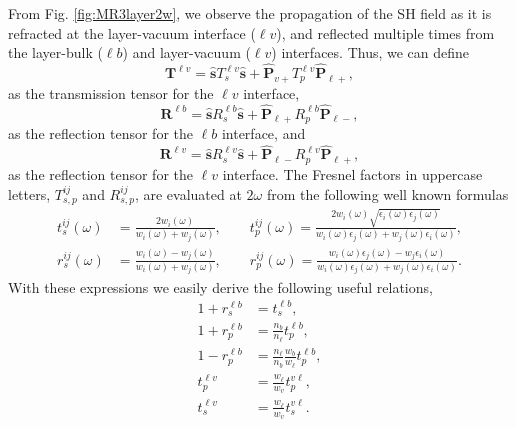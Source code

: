 From Fig. \ref{fig:MR3layer2w}, we observe the propagation of the SH field as it
is refracted at the layer-vacuum interface ($\ell v$), and  reflected multiple
times from the layer-bulk ($\ell b$) and layer-vacuum ($\ell v$) interfaces.
Thus, we can define
\begin{equation}\label{eq:r5}
\mathbf{T}^{\ell v}
= \hat{\mathbf{s}}T_{s}^{\ell v}\hat{\mathbf{s}} 
+ \hat{\mathbf{P}}_{v+}T_{p}^{\ell v} \hat{\mathbf{P}}_{\ell +},
\end{equation}
as the transmission tensor for the $\ell v$ interface,
\begin{equation}\label{eq:r6}
\mathbf{R}^{\ell b}
= \hat{\mathbf{s}}R_{s}^{\ell b}\hat{\mathbf{s}}
+ \hat{\mathbf{P}}_{\ell +}R_{p}^{\ell b} \hat{\mathbf{P}}_{\ell -},
\end{equation} 
as the reflection tensor for the $\ell b$ interface, and
\begin{equation}\label{eq:r6b}
\mathbf{R}^{\ell v}
= \hat{\mathbf{s}}R_{s}^{\ell v}\hat{\mathbf{s}}
+ \hat{\mathbf{P}}_{\ell -}R_{p}^{\ell v} \hat{\mathbf{P}}_{\ell +},
\end{equation} 
as the reflection tensor for the $\ell v$ interface. The Fresnel factors in
uppercase letters, $T^{ij}_{s,p}$ and $R^{ij}_{s,p}$, are evaluated at $2\omega$
from the following well known formulas
\begin{equation}\label{eq:e.f1}
\begin{split}
t_{s}^{ij}(\omega) &=
\frac{2w_{i}(\omega)}{w_{i}(\omega) + w_{j}(\omega)},
\quad\quad  
t_{p}^{ij}(\omega) =
\frac{2w_{i}(\omega)\sqrt{\epsilon_{i}(\omega)\epsilon_j(\omega)}}
     {w_{i}(\omega)\epsilon_{j}(\omega) + w_{j}(\omega)\epsilon_{i}(\omega)},\\
r_{s}^{ij}(\omega) &=
\frac{w_{i}(\omega) - w_{j}(\omega)}
     {w_{i}(\omega) + w_{j}(\omega)},
\quad\quad 
r_{p}^{ij}(\omega) =
\frac{w_{i}(\omega)\epsilon_{j}(\omega) - w_{j}\epsilon_{i}(\omega)}
     {w_{i}(\omega)\epsilon_{j}(\omega) + w_{j}(\omega)\epsilon_{i}(\omega)}. 
\end{split}
\end{equation}
With these expressions we easily derive the following useful relations,
\begin{equation}\label{eq:mf}
\begin{split}
1 + r^{\ell b}_{s} &= t^{\ell b}_{s},\\
1 + r^{\ell b}_{p} &= \frac{n_{b}}{n_{\ell}}t^{\ell b}_{p},\\
1 - r^{\ell b}_{p} &= \frac{n_{\ell}}{n_{b}}\frac{w_{b}}{w_{\ell}}
                      t^{\ell b}_{p},\\
t^{\ell v}_{p} &= \frac{w_{\ell}}{w_{v}}t^{v\ell}_{p},\\
t^{\ell v}_{s} &= \frac{w_{\ell}}{w_{v}}t^{v\ell}_{s}.
\end{split}
\end{equation}


